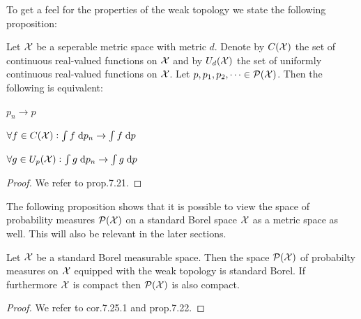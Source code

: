 To get a feel for the properties of the weak topology we state the following
proposition:

\begin{prop}
  Let $\mathcal{X}$ be a seperable metric space with metric $d$.
  Denote by $C(\mathcal{X})$ the set of continuous real-valued functions on $\mathcal{X}$
  and by $U_d(\mathcal{X})$ the set of uniformly continuous real-valued functions
  on $\mathcal{X}$. Let $p, p_1, p_2, \dots \in \mathcal{P}(\mathcal{X})$. Then
  the following is equivalent:
  \begin{center}
    \begin{enumerate*}[label=(\alph*), itemjoin=\hspace{0.3in}]
    \item $p_n \to p$
    \item $\forall f \in C(\mathcal{X}) : \int f \; \mathrm{d} p_n \to \int f \; \mathrm{d} p$
    \item $\forall g \in U_p(\mathcal{X}) : \int g \; \mathrm{d} p_n \to \int g \; \mathrm{d} p$
  \end{enumerate*}
\end{center}
\end{prop}
\begin{proof}
  We refer to  prop.7.21.
\end{proof}

The following proposition shows that it is possible to view the
space of probability measures $\mathcal{P}(\mathcal{X})$ on a standard Borel space
$\mathcal{X}$ as a metric space as well. This will also be relevant 
in the later sections.

\begin{prop}
  Let $\mathcal{X}$ be a standard Borel measurable space.
  Then the space $\mathcal{P}(\mathcal{X})$ of probabilty measures on $\mathcal{X}$
  equipped with the weak topology is standard Borel.
  If furthermore $\mathcal{X}$ is compact then $\mathcal{P}(\mathcal{X})$ is also compact.
  \label{prop:pxstandardborel}
\end{prop}
\begin{proof}
  We refer to  cor.7.25.1 and prop.7.22.
\end{proof}

